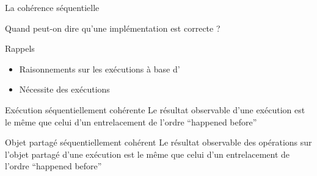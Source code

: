 
\begingroup

\begin{frame}[fragile]{La cohérence séquentielle}

  \vfill
  \begin{center}
    \alert{Quand peut-on dire qu'une implémentation est \alert{correcte} ?}
  \end{center}    

  \vfill
  \begin{block}{Rappels}
    \begin{itemize}
    \item Raisonnements sur les exécutions à base d'
    \item Nécessite des exécutions 
    \end{itemize}
  \end{block}
  \vfill

  \begin{block}{Exécution séquentiellement cohérente}
    Le résultat observable d'une exécution est le même que celui d'un entrelacement de l'ordre ``happened before''
  \end{block}

  \pause

  \vfill
  \begin{block}{Objet partagé séquentiellement cohérent}
    Le résultat observable \alert{des opérations sur l'objet partagé} d'une exécution est le même que celui d'un entrelacement de l'ordre ``happened before''
  \end{block}
  \vfill

\end{frame}

\endgroup
\endinput
